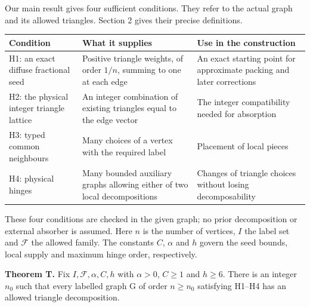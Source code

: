 \documentclass[english,11pt,a4paper]{article}
\begin{document}
Our main result gives four sufficient conditions. They refer to the actual graph and its allowed triangles. Section 2 gives their precise definitions.

{\begin{longtable}[]{@{}
  >{\raggedright\arraybackslash}p{}
  >{\raggedright\arraybackslash}p{}
  >{\raggedright\arraybackslash}p{}@{}}
\toprule\noalign{}
\begin{minipage}[b]{\linewidth}\raggedright
Condition
\end{minipage} & \begin{minipage}[b]{\linewidth}\raggedright
What it supplies
\end{minipage} & \begin{minipage}[b]{\linewidth}\raggedright
Use in the construction
\end{minipage} \\
\midrule\noalign{}
\endhead
\bottomrule\noalign{}
\endlastfoot
H1: an exact diffuse fractional seed & Positive triangle weights, of order \(1/n\), summing to one at each edge & An exact starting point for approximate packing and later corrections \\
H2: the physical integer triangle lattice & An integer combination of existing triangles equal to the edge vector & The integer compatibility needed for absorption \\
H3: typed common neighbours & Many choices of a vertex with the required label & Placement of local pieces \\
H4: physical hinges & Many bounded auxiliary graphs allowing either of two local decompositions & Changes of triangle choices without losing decomposability \\
\end{longtable}
}

These four conditions are checked in the given graph; no prior decomposition or external absorber is assumed. Here \(n\) is the number of vertices, \(I\) the label set and \(\mathcal F\) the allowed family. The constants \(C\), \(\alpha\) and \(h\) govern the seed bounds, local supply and maximum hinge order, respectively.

\textbf{Theorem T.} Fix \(I,\mathcal F,\alpha,C,h\) with \(\alpha>0\), \(C\geq1\) and \(h\geq6\). There is an integer \(n_0\) such that every labelled graph G of order \(n\geq n_0\) satisfying H1--H4 has an allowed triangle decomposition.
\end{document}
